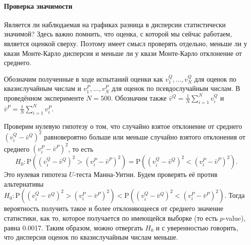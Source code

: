 \documentclass[specialist,
               substylefile = ../spbu.rtx,
               subf,href,colorlinks=true, 12pt]{disser}
\newcommand{\prob}[1]{\mathrm{P}\left(#1\right)}
\begin{document}
\paragraph{Проверка значимости} 

Является ли наблюдаемая на графиках разница в дисперсии статистически значимой? Здесь важно помнить, что оценка, с которой мы сейчас работаем, является оценкой сверху. Поэтому имеет смысл проверять отдельно, меньше ли у квази Монте-Карло дисперсия и меньше ли у квази Монте-Карло отклонение от среднего.

Обозначим полученные в ходе испытаний оценки как $v_1^Q, \dots, v_N^Q$ для оценок по квазислучайным числам и $v_1^P, \dots, v_N^P$ для оценок по псевдослучайным числам. В проведённом эксперименте $N = 500$. Обозначим также $\bar v^Q = \frac{1}{N}\sum_{i=1}^N v_i^Q$ и $\bar v^P = \frac{1}{N}\sum_{i=1}^N v_i^P$.

Проверим нулевую гипотезу о том, что случайно взятое отклонение от среднего $\left(v_i^Q - \bar v^Q\right)^2$ равновероятно больше или меньше случайно взятого отклонения от среднего $\left(v_i^P - \bar v^P\right)^2$, то есть
$$H_0: \prob{\left(v_i^Q - \bar v^Q\right)^2 > \left(v_i^P - \bar v^P\right)^2} = \prob{\left(v_i^Q - \bar v^Q\right)^2 < \left(v_i^P - \bar v^P\right)^2}.$$
Это нулевая гипотеза $U$-теста Манна-Уитни. Будем проверять её против альтернативы $H_0: \prob{\left(v_i^Q - \bar v^Q\right)^2 > \left(v_i^P - \bar v^P\right)^2} < \prob{\left(v_i^Q - \bar v^Q\right)^2 < \left(v_i^P - \bar v^P\right)^2}$. Тогда вероятность получить такое и более отклоняющееся от среднего значение статистики, как то, которое получается по имеющейся выборке (то есть $p$-value), равна 0.0017. Таким образом, можно отвергать $H_0$ и с уверенностью говорить, что дисперсия оценок по квазислучайным числам меньше.



\end{document}
